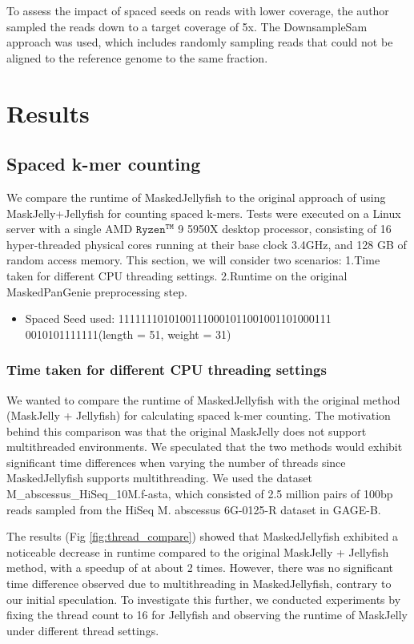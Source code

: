 \documentclass{PHlab-thesis}
\begin{document}
To assess the impact of spaced seeds on reads with lower coverage, the author sampled the reads down to a target coverage of 5x. The DownsampleSam approach was used, which includes randomly sampling reads that could not be aligned to the reference genome to the same fraction.

\chapter{Results}

\section{Spaced k-mer counting}
We compare the runtime of MaskedJellyfish to the original approach of using MaskJelly+Jellyfish for counting spaced k-mers. Tests were executed on a Linux server with a single AMD $\texttt{Ryzen}^{\texttt{TM}}$ 9 5950X desktop processor, consisting of 16 hyper-threaded physical cores running at their base clock 3.4GHz, and 128 GB of random access memory. This section, we will consider two scenarios: 1.Time taken for different CPU threading settings. 2.Runtime on the original MaskedPanGenie preprocessing step.
\begin{itemize}
    \item Spaced Seed used: 11111110101001110001011001001101000111\\0010101111111(length = 51, weight = 31)
\end{itemize}
\subsection{Time taken for different CPU threading settings} 
We wanted to compare the runtime of MaskedJellyfish with the original method (MaskJelly + Jellyfish) for calculating spaced k-mer counting. The motivation behind this comparison was that the original MaskJelly does not support multithreaded environments. We speculated that the two methods would exhibit significant time differences when varying the number of threads since MaskedJellyfish supports multithreading. We used the dataset M\_abscessus\_HiSeq\_10M.f-asta, which consisted of 2.5 million pairs of 100bp reads sampled from the HiSeq M. abscessus 6G-0125-R dataset in GAGE-B.

The results (Fig \ref{fig:thread_compare}) showed that MaskedJellyfish exhibited a noticeable decrease in runtime compared to the original MaskJelly + Jellyfish method, with a speedup of at about 2 times. However, there was no significant time difference observed due to multithreading in MaskedJellyfish, contrary to our initial speculation. To investigate this further, we conducted experiments by fixing the thread count to 16 for Jellyfish and observing the runtime of MaskJelly under different thread settings.
\end{document}
